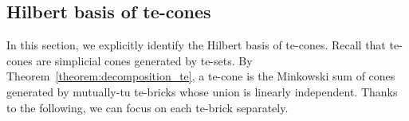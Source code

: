 \documentclass[11pt,a4paper]{amsart}
\theoremstyle{plain}
\theoremstyle{definition}
\newcommand{\cal}[1]{\mathcal{#1}}
\renewcommand{\cal}[1]{\mathcal{#1}}
\begin{document}
	
	
	\subsection{Hilbert basis of te-cones}\label{section:hb_te-bricks}
	
	In this section, we explicitly identify the Hilbert basis of te-cones.
	Recall that te-cones are simplicial cones generated by te-sets.
	By Theorem~\ref{theorem:decomposition_te}, a te-cone is the Minkowski sum of cones generated by mutually-tu te-bricks whose union is linearly independent.
	Thanks to the following, we can focus on each te-brick separately.
	
\end{document}
